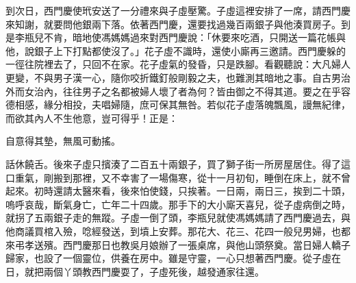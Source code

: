 到次日，西門慶使玳安送了一分禮來與子虛壓驚。子虛這裡安排了一席，請西門慶來知謝，就要問他銀兩下落。依著西門慶，還要找過幾百兩銀子與他湊買房子。到是李瓶兒不肯，暗地使馮媽媽過來對西門慶說：「休要來吃酒，只開送一篇花帳與他，說銀子上下打點都使沒了。」花子虛不識時，還使小廝再三邀請。西門慶躲的一徑往院裡去了，只回不在家。花子虛氣的發昏，只是跌腳。看觀聽說：大凡婦人更變，不與男子漢一心，隨你咬折鐵釘般剛毅之夫，也難測其暗地之事。自古男治外而女治內，往往男子之名都被婦人壞了者為何？皆由御之不得其道。要之在乎容德相感，緣分相投，夫唱婦隨，庶可保其無咎。若似花子虛落魄飄風，謾無紀律，而欲其內人不生他意，豈可得乎！正是：

自意得其墊，無風可動搖。

話休饒舌。後來子虛只擯湊了二百五十兩銀子，買了獅子街一所房屋居住。得了這口重氣，剛搬到那裡，又不幸害了一場傷寒，從十一月初旬，睡倒在床上，就不曾起來。初時還請太醫來看，後來怕使錢，只挨著。一日兩，兩日三，挨到二十頭，嗚呼哀哉，斷氣身亡，亡年二十四歲。那手下的大小廝天喜兒，從子虛病倒之時，就拐了五兩銀子走的無蹤。子虛一倒了頭，李瓶兒就使馮媽媽請了西門慶過去，與他商議買棺入殮，唸經發送，到墳上安葬。那花大、花三、花四一般兒男婦，也都來弔孝送殯。西門慶那日也教吳月娘辦了一張桌席，與他山頭祭奠。當日婦人轎子歸家，也設了一個靈位，供養在房中。雖是守靈，一心只想著西門慶。從子虛在日，就把兩個丫頭教西門慶耍了，子虛死後，越發通家往還。

